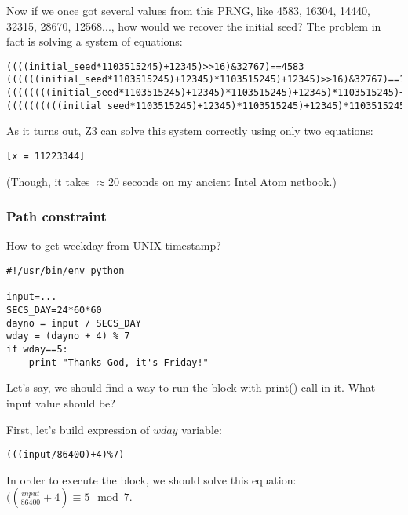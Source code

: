 

Now if we once got several values from this PRNG, like 4583, 16304, 14440, 32315, 28670, 12568..., how would we
recover the initial seed?
The problem in fact is solving a system of equations:

\begin{lstlisting}
((((initial_seed*1103515245)+12345)>>16)&32767)==4583
((((((initial_seed*1103515245)+12345)*1103515245)+12345)>>16)&32767)==16304
((((((((initial_seed*1103515245)+12345)*1103515245)+12345)*1103515245)+12345)>>16)&32767)==14440
((((((((((initial_seed*1103515245)+12345)*1103515245)+12345)*1103515245)+12345)*1103515245)+12345)>>16)&32767)==32315
\end{lstlisting}

As it turns out, Z3 can solve this system correctly using only two equations:



\begin{lstlisting}
[x = 11223344]
\end{lstlisting}

(Though, it takes $\approx 20$ seconds on my ancient Intel Atom netbook.)

\subsubsection{Path constraint}

How to get weekday from UNIX timestamp?

\begin{lstlisting}
#!/usr/bin/env python

input=...
SECS_DAY=24*60*60
dayno = input / SECS_DAY
wday = (dayno + 4) % 7
if wday==5:
    print "Thanks God, it's Friday!"
\end{lstlisting}

Let's say, we should find a way to run the block with print() call in it.
What input value should be?

First, let's build expression of $wday$ variable:



\begin{lstlisting}
(((input/86400)+4)%7)
\end{lstlisting}

In order to execute the block, we should solve this equation: $((\frac{input}{86400}+4) \equiv 5 \mod 7$.

